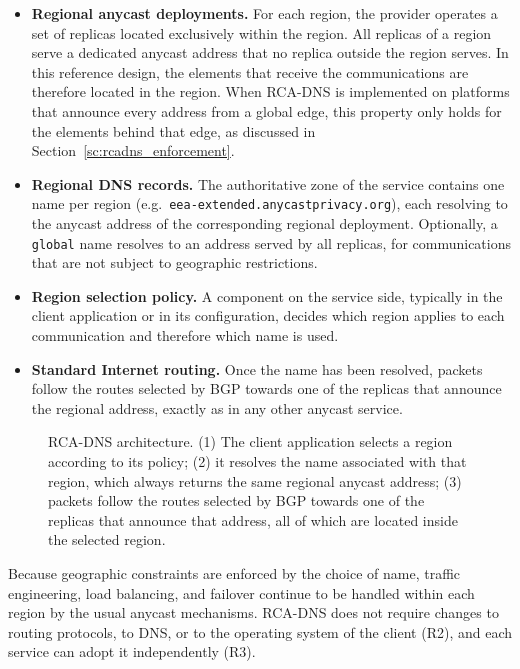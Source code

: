 \begin{itemize}
    \item \textbf{Regional anycast deployments.} For each region, the provider operates a set of replicas located exclusively within the region. All replicas of a region serve a dedicated anycast address that no replica outside the region serves. In this reference design, the elements that receive the communications are therefore located in the region. When RCA-DNS is implemented on platforms that announce every address from a global edge, this property only holds for the elements behind that edge, as discussed in Section~\ref{sc:rcadns_enforcement}.

    \item \textbf{Regional DNS records.} The authoritative zone of the service contains one name per region (e.g.\ \texttt{eea-extended.anycastprivacy.org}), each resolving to the anycast address of the corresponding regional deployment. Optionally, a \texttt{global} name resolves to an address served by all replicas, for communications that are not subject to geographic restrictions.

    \item \textbf{Region selection policy.} A component on the service side, typically in the client application or in its configuration, decides which region applies to each communication and therefore which name is used.
    
    \item \textbf{Standard Internet routing.} Once the name has been resolved, packets follow the routes selected by BGP towards one of the replicas that announce the regional address, exactly as in any other anycast service.
\end{itemize}

\begin{figure}[ht]
    \centering
    \resizebox{\textwidth}{!}{}
    \caption{RCA-DNS architecture. (1) The client application selects a region according to its policy; (2) it resolves the name associated with that region, which always returns the same regional anycast address; (3) packets follow the routes selected by BGP towards one of the replicas that announce that address, all of which are located inside the selected region.}
    \label{fig:rcadns_architecture}
\end{figure}

Because geographic constraints are enforced by the choice of name, traffic engineering, load balancing, and failover continue to be handled within each region by the usual anycast mechanisms. RCA-DNS does not require changes to routing protocols, to DNS, or to the operating system of the client (R2), and each service can adopt it independently (R3).

